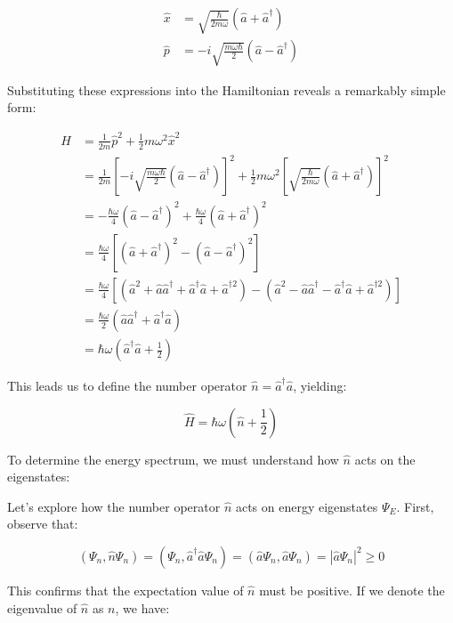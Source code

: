 \begin{align}
\hat{x} &= \sqrt{\frac{\hbar}{2m\omega}}(\hat{a} + \hat{a}^\dagger) \\
\hat{p} &= -i\sqrt{\frac{m\omega\hbar}{2}}(\hat{a} - \hat{a}^\dagger)
\end{align}

Substituting these expressions into the Hamiltonian reveals a remarkably simple form:

\begin{align}
\hat{H} &= \frac{1}{2m}\hat{p}^2 + \frac{1}{2}m\omega^2\hat{x}^2 \\
&= \frac{1}{2m}\left[-i\sqrt{\frac{m\omega\hbar}{2}}(\hat{a} - \hat{a}^\dagger)\right]^2 + \frac{1}{2}m\omega^2\left[\sqrt{\frac{\hbar}{2m\omega}}(\hat{a} + \hat{a}^\dagger)\right]^2 \\
&= -\frac{\hbar\omega}{4}(\hat{a} - \hat{a}^\dagger)^2 + \frac{\hbar\omega}{4}(\hat{a} + \hat{a}^\dagger)^2 \\
&= \frac{\hbar\omega}{4}[(\hat{a} + \hat{a}^\dagger)^2 - (\hat{a} - \hat{a}^\dagger)^2]  \\
&= \frac{\hbar\omega}{4}[(\hat{a}^2 + \hat{a}\hat{a}^\dagger + \hat{a}^\dagger\hat{a} + \hat{a}^{\dagger2}) - (\hat{a}^2 - \hat{a}\hat{a}^\dagger - \hat{a}^\dagger\hat{a} + \hat{a}^{\dagger2})] \\
&= \frac{\hbar\omega}{2}(\hat{a}\hat{a}^\dagger + \hat{a}^\dagger\hat{a}) \\
&= \hbar\omega\left(\hat{a}^\dagger\hat{a} + \frac{1}{2}\right)
\end{align}

This leads us to define the number operator $\hat{n} = \hat{a}^\dagger\hat{a}$, yielding:

\begin{equation}
\hat{H} = \hbar\omega\left(\hat{n} + \frac{1}{2}\right)
\end{equation}

To determine the energy spectrum, we must understand how $\hat{n}$ acts on the eigenstates:


Let's explore how the number operator $\hat{n}$ acts on energy eigenstates $\Psi_E$. First, observe that:

\begin{equation}
(\Psi_n, \hat{n}\Psi_n) = (\Psi_n, \hat{a}^\dagger\hat{a}\Psi_n) = (\hat{a}\Psi_n, \hat{a}\Psi_n) = |\hat{a}\Psi_n|^2 \geq 0
\end{equation}

This confirms that the expectation value of $\hat{n}$ must be positive. If we denote the eigenvalue of $\hat{n}$ as $n$, we have:


